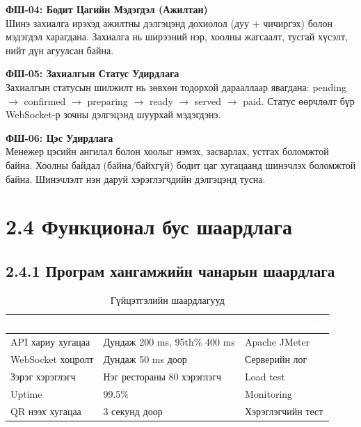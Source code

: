 \textbf{ФШ-04: Бодит Цагийн Мэдэгдэл (Ажилтан)}\\
Шинэ захиалга ирэхэд ажилтны дэлгэцэнд дохиолол (дуу + чичиргэх) болон мэдэгдэл
харагдана. Захиалга нь ширээний нэр, хоолны жагсаалт, тусгай хүсэлт, нийт дүн
агуулсан байна.

\textbf{ФШ-05: Захиалгын Статус Удирдлага}\\
Захиалгын статусын шилжилт нь зөвхөн тодорхой дарааллаар явагдана:
pending $\rightarrow$ confirmed $\rightarrow$ preparing $\rightarrow$ ready $\rightarrow$ served $\rightarrow$ paid.
Статус өөрчлөлт бүр WebSocket-р зочны дэлгэцэнд шуурхай мэдэгдэнэ.

\textbf{ФШ-06: Цэс Удирдлага}\\
Менежер цэсийн ангилал болон хоолыг нэмэх, засварлах, устгах боломжтой байна.
Хоолны байдал (байна/байхгүй) бодит цаг хугацаанд шинэчлэх боломжтой байна.
Шинэчлэлт нэн даруй хэрэглэгчдийн дэлгэцэнд тусна.

\section{2.4 Функционал бус шаардлага}

\subsection{2.4.1 Програм хангамжийн чанарын шаардлага}

\begin{table}[htbp]
\caption{Гүйцэтгэлийн шаардлагууд}
\label{tab:perf}
\centering
\begin{tabularx}{\textwidth}{|X|X|X|}
\hline
\rowcolor{TableHeader}\textcolor{white}{\textbf{Метрик}}
  & \textcolor{white}{\textbf{Зорилт}}
  & \textcolor{white}{\textbf{Хэмжих аргачлал}} \\ \hline
API хариу хугацаа    & Дундаж 200 ms, 95th\% 400 ms & Apache JMeter \\ \hline
WebSocket хоцролт    & Дундаж 50 ms доор             & Серверийн лог \\ \hline
Зэрэг хэрэглэгч      & Нэг рестораны 80 хэрэглэгч   & Load test \\ \hline
Uptime               & 99.5\%                        & Monitoring \\ \hline
QR нээх хугацаа      & 3 секунд доор                 & Хэрэглэгчийн тест \\ \hline
\end{tabularx}
\end{table}

